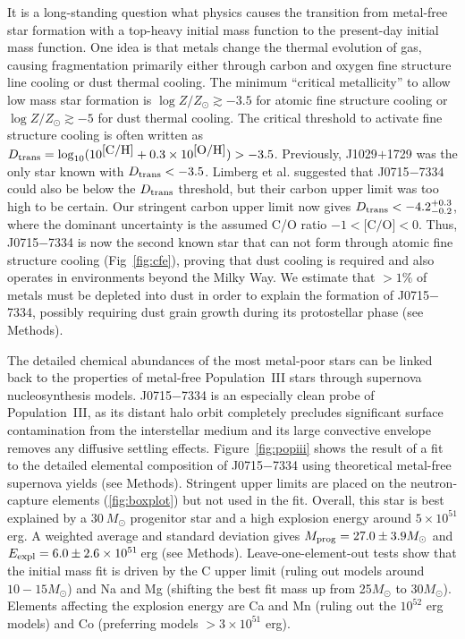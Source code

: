 \documentclass{natureprintstyle}
\newcommand{\logzzsun}{\ensuremath{\log Z/Z_\odot}\xspace}
\newcommand{\umpstar}{J0715$-$7334\xspace}
\newcommand{\caffaustar}{J1029$+$1729\xspace}
\begin{document}
It is a long-standing question what physics causes the transition from metal-free star formation with a top-heavy initial mass function to the present-day initial mass function\cite{Bromm2009,Frebel2015,Klessen2023}. 
One idea is that metals change the thermal evolution of gas, causing fragmentation primarily either through carbon and oxygen fine structure line cooling or dust thermal cooling\cite{Schneider2003,Schneider2012,Bromm2003}.
The minimum ``critical metallicity'' to allow low mass star formation is $\logzzsun \gtrsim -3.5$ for atomic fine structure cooling\cite{Bromm2003,Frebel2007} or $\logzzsun \gtrsim -5$ for dust thermal cooling\cite{Schneider2003,Schneider2012,Schneider2012b,Chiaki2017}. 
The critical threshold to activate fine structure cooling is often written as $D_{\rm trans}=\log_{10}(10^{\mbox{[C/H]}} + 0.3 \times 10^{\mbox{[O/H]}}) > -3.5$\cite{Frebel2007}.
Previously, \caffaustar was the only star known with $D_{\rm trans} < -3.5$\cite{Caffau2011,Caffau2024}.
Limberg et al.\cite{Limberg2025} suggested that \umpstar could also be below the $D_{\rm trans}$ threshold, but their carbon upper limit was too high to be certain. 
Our stringent carbon upper limit now gives $D_{\rm trans} < -4.2_{-0.2}^{+0.3}$, where the dominant uncertainty is the assumed C/O ratio $-1 < \mbox{[C/O]} < 0$. 
Thus, \umpstar is now the second known star that can not form through atomic fine structure cooling (Fig~\ref{fig:cfe}), proving that dust cooling is required and also operates in environments beyond the Milky Way.
We estimate that ${>}1\%$ of metals must be depleted into dust in order to explain the formation of \umpstar, possibly requiring dust grain growth during its protostellar phase (see Methods).

The detailed chemical abundances of the most metal-poor stars can be linked back to the properties of metal-free Population~III stars through supernova nucleosynthesis models\cite{Bromm2009,Frebel2015,Klessen2023}. 
\umpstar is an especially clean probe of Population~III, as its distant halo orbit completely precludes significant surface contamination from the interstellar medium\cite{Frebel2009,Shen2017} and its large convective envelope removes any diffusive settling effects. 
Figure~\ref{fig:popiii} shows the result of a fit to the detailed elemental composition of \umpstar using theoretical metal-free supernova yields\cite{Heger2010} (see Methods).
Stringent upper limits are placed on the neutron-capture elements (\ref{fig:boxplot}) but not used in the fit.
Overall, this star is best explained by a $30~M_\odot$ progenitor star and a high explosion energy around $5 \times 10^{51}$ erg.
A weighted average and standard deviation gives $M_{\rm prog} = 27.0 \pm 3.9 M_\odot$ and $E_{\rm expl} = 6.0 \pm 2.6 \times 10^{51}$\,erg (see Methods).
Leave-one-element-out tests show that the initial mass fit is driven by the C upper limit (ruling out models around $10-15 M_\odot$) and Na and Mg (shifting the best fit mass up from 25$M_\odot$ to 30$M_\odot$). 
Elements affecting the explosion energy are Ca and Mn (ruling out the $10^{52}$ erg models) and Co (preferring models $>3 \times 10^{51}$ erg).
\end{document}
